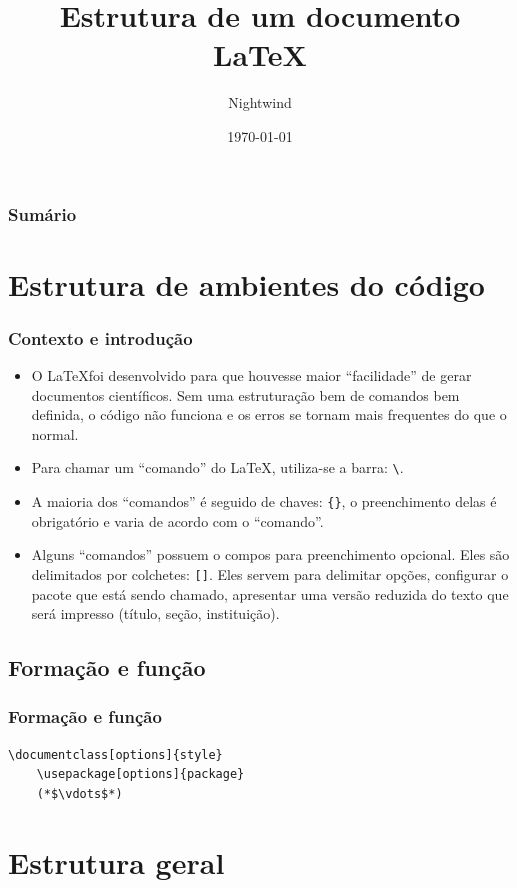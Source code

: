 \documentclass{beamer}
\title{Estrutura de um documento \LaTeX}
\author{Nightwind}
\institute[CTISM]{Colégio Técnico Industrial de Santa Maria}
\date{\today}
\begin{document}
\frame{\titlepage}

\begin{frame}
    \frametitle{Sumário}
    \tableofcontents
\end{frame}


\section{Estrutura de ambientes do código}
\begin{frame}[fragile]
    \frametitle{Contexto e introdução}

    \begin{itemize}
        \item O \LaTeX foi desenvolvido para que houvesse maior ``facilidade'' de gerar documentos científicos. Sem uma estruturação bem de comandos bem definida, o código não funciona e os erros se tornam mais frequentes do que o normal.
        \item Para chamar um ``comando'' do \LaTeX, utiliza-se a barra: \lstinline!\!. 
        \item A maioria dos ``comandos'' é seguido de chaves: \lstinline!{}!, o preenchimento delas é obrigatório e varia de acordo com o ``comando''.
        \item Alguns ``comandos'' possuem o compos para preenchimento opcional. Eles são delimitados por colchetes: \lstinline![]!. Eles servem para delimitar opções, configurar o pacote que está sendo chamado, apresentar uma versão reduzida do texto que será impresso (título, seção, instituição).
    \end{itemize}
\end{frame}

\subsection{Formação e função}
\begin{frame}[fragile]
    \frametitle{Formação e função}

    \begin{lstlisting}[style = myStyleLatex]
    \documentclass[options]{style}
    \usepackage[options]{package}
    (*$\vdots$*)
    \end{lstlisting}

\end{frame}


\section{Estrutura geral}
\end{document}
